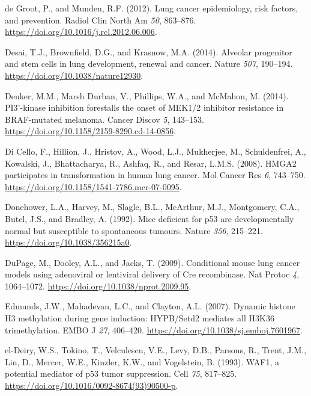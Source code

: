 \begin{CSLReferences}{0}{0}
\leavevmode{}%
de Groot, P., and Munden, R.F. (2012). Lung cancer epidemiology, risk factors, and prevention. Radiol Clin North Am \emph{50}, 863--876. \url{https://doi.org/10.1016/j.rcl.2012.06.006}.

\leavevmode{}%
Desai, T.J., Brownfield, D.G., and Krasnow, M.A. (2014). Alveolar progenitor and stem cells in lung development, renewal and cancer. Nature \emph{507}, 190--194. \url{https://doi.org/10.1038/nature12930}.

\leavevmode{}%
Deuker, M.M., Marsh Durban, V., Phillips, W.A., and McMahon, M. (2014). PI3'-kinase inhibition forestalls the onset of MEK1/2 inhibitor resistance in BRAF-mutated melanoma. Cancer Discov \emph{5}, 143--153. \url{https://doi.org/10.1158/2159-8290.cd-14-0856}.

\leavevmode{}%
Di Cello, F., Hillion, J., Hristov, A., Wood, L.J., Mukherjee, M., Schuldenfrei, A., Kowalski, J., Bhattacharya, R., Ashfaq, R., and Resar, L.M.S. (2008). HMGA2 participates in transformation in human lung cancer. Mol Cancer Res \emph{6}, 743--750. \url{https://doi.org/10.1158/1541-7786.mcr-07-0095}.

\leavevmode{}%
Donehower, L.A., Harvey, M., Slagle, B.L., McArthur, M.J., Montgomery, C.A., Butel, J.S., and Bradley, A. (1992). Mice deficient for p53 are developmentally normal but susceptible to spontaneous tumours. Nature \emph{356}, 215--221. \url{https://doi.org/10.1038/356215a0}.

\leavevmode{}%
DuPage, M., Dooley, A.L., and Jacks, T. (2009). Conditional mouse lung cancer models using adenoviral or lentiviral delivery of Cre recombinase. Nat Protoc \emph{4}, 1064--1072. \url{https://doi.org/10.1038/nprot.2009.95}.

\leavevmode{}%
Edmunds, J.W., Mahadevan, L.C., and Clayton, A.L. (2007). Dynamic histone H3 methylation during gene induction: HYPB/Setd2 mediates all H3K36 trimethylation. EMBO J \emph{27}, 406--420. \url{https://doi.org/10.1038/sj.emboj.7601967}.

\leavevmode{}%
el-Deiry, W.S., Tokino, T., Velculescu, V.E., Levy, D.B., Parsons, R., Trent, J.M., Lin, D., Mercer, W.E., Kinzler, K.W., and Vogelstein, B. (1993). WAF1, a potential mediator of p53 tumor suppression. Cell \emph{75}, 817--825. \url{https://doi.org/10.1016/0092-8674(93)90500-p}.


\end{CSLReferences}
